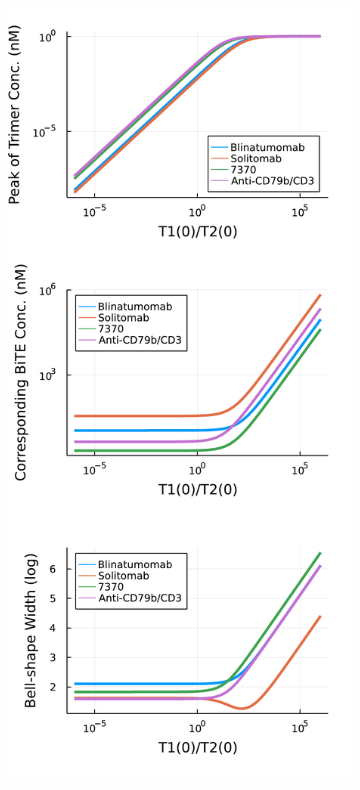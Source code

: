 \begin{figure}
\begin{subfigure}[b]{0.48\textwidth}
		\caption{}
		\label{fig:9}
	\end{subfigure} 
	\begin{subfigure}[b]{0.48\textwidth}
		\centering
		\includegraphics[width=1\textwidth]{fig/compare-liquid.pdf}

\end{subfigure}
\end{figure}
